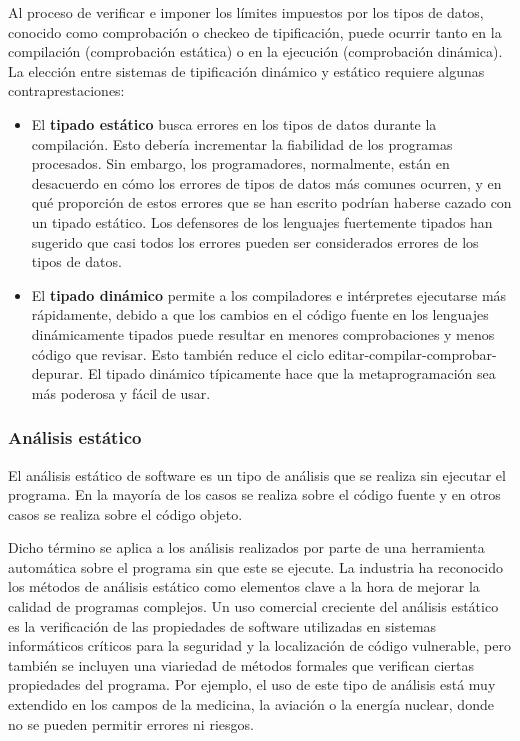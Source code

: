 Al proceso de verificar e imponer los l\'imites impuestos por los tipos de datos, conocido como comprobaci\'on o checkeo de tipificaci\'on, puede ocurrir tanto en la compilaci\'on (comprobaci\'on est\'atica) o en la ejecuci\'on (comprobaci\'on din\'amica). La elecci\'on entre sistemas de tipificaci\'on din\'amico y est\'atico requiere algunas contraprestaciones:

\begin{itemize}
\item El \textbf{tipado est\'atico} busca errores en los tipos de datos durante la compilaci\'on. Esto deber\'ia incrementar la fiabilidad de los programas procesados. Sin embargo, los programadores, normalmente, est\'an en desacuerdo en c\'omo los errores de tipos de datos m\'as comunes ocurren, y en qu\'e proporci\'on de estos errores que se han escrito podr\'ian haberse cazado con un tipado est\'atico.  Los defensores de los lenguajes fuertemente tipados han sugerido que casi todos los errores pueden ser considerados errores de los tipos de datos.
\item El \textbf{tipado din\'amico} permite a los compiladores e int\'erpretes ejecutarse m\'as r\'apidamente, debido a que los cambios en el c\'odigo fuente en los lenguajes din\'amicamente tipados puede resultar en menores comprobaciones y menos c\'odigo que revisar. Esto tambi\'en reduce el ciclo editar-compilar-comprobar-depurar. El tipado din\'amico t\'ipicamente hace que la metaprogramaci\'on sea m\'as poderosa y f\'acil de usar.
\end{itemize}


\subsubsection*{An\'alisis est\'atico}

El an\'alisis est\'atico de software es un tipo de an\'alisis que se realiza sin ejecutar el programa. En la mayor\'ia de los casos se realiza sobre el c\'odigo fuente y en otros casos se realiza sobre el c\'odigo objeto.

Dicho t\'ermino se aplica a los an\'alisis realizados por parte de una herramienta autom\'atica sobre el programa sin que este se ejecute. La industria ha reconocido los m\'etodos de an\'alisis est\'atico como elementos clave a la hora de mejorar la calidad de programas complejos. Un uso comercial creciente del an\'alisis est\'atico es la verificaci\'on de las propiedades de software utilizadas en sistemas inform\'aticos cr\'iticos para la seguridad y la localizaci\'on de c\'odigo vulnerable, pero tambi\'en se incluyen una viariedad de m\'etodos formales que verifican ciertas propiedades del programa. Por ejemplo, el uso de este tipo de an\'alisis est\'a muy extendido en los campos de la medicina, la aviaci\'on o la energ\'ia nuclear, donde no se pueden permitir errores ni riesgos.


